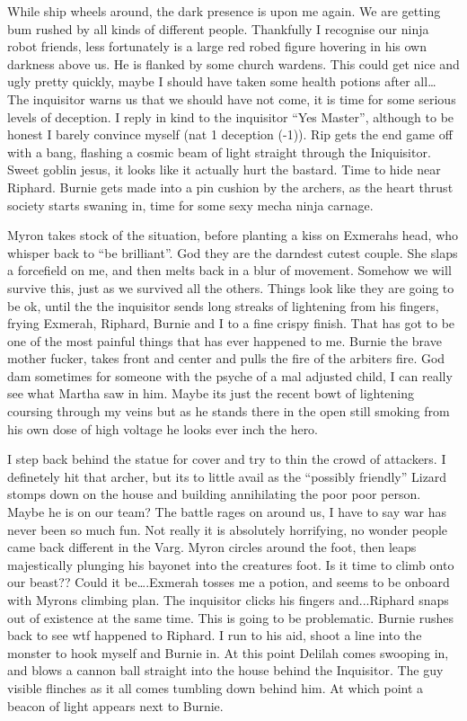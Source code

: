 \begin{multicols}{2}
While ship wheels around, the dark presence is upon me again. We are getting bum rushed by all kinds of different people. Thankfully I recognise our ninja robot friends, less fortunately is a large red robed figure hovering in his own darkness above us. He is flanked by some church wardens. This could get nice and ugly pretty quickly, maybe I should have taken some health potions after all… The inquisitor warns us that we should have not come, it is time for some serious levels of deception. I reply in kind to the inquisitor “Yes Master”, although to be honest I barely convince myself (nat 1 deception (-1)). Rip gets the end game off with a bang, flashing a cosmic beam of light straight through the Iniquisitor. Sweet goblin jesus, it looks like it actually hurt the bastard. Time to hide near Riphard. Burnie gets made into a pin cushion by the archers, as the heart thrust society starts swaning in, time for some sexy mecha ninja carnage.\medskip

Myron takes stock of the situation, before planting a kiss on Exmerahs head, who whisper back to “be brilliant”. God they are the darndest cutest couple. She slaps a forcefield on me, and then melts back in a blur of movement. Somehow we will survive this, just as we survived all the others. Things look like they are going to be ok, until the the inquisitor sends long streaks of lightening from his fingers, frying Exmerah, Riphard, Burnie and I to a fine crispy finish. That has got to be one of the most painful things that has ever happened to me. Burnie the brave mother fucker, takes front and center and pulls the fire of the arbiters fire. God dam sometimes for someone with the psyche of a mal adjusted child, I can really see what Martha saw in him. Maybe its just the recent bowt of lightening coursing through my veins but as he stands there in the open still smoking from his own dose of high voltage he looks ever inch the hero.\medskip

I step back behind the statue for cover and try to thin the crowd of attackers. I definetely hit that archer, but its to little avail as the “possibly friendly” Lizard stomps down on the house and building annihilating the poor poor person. Maybe he is on our team? The battle rages on around us, I have to say war has never been so much fun. Not really it is absolutely horrifying, no wonder people came back different in the Varg. Myron circles around the foot, then leaps majestically plunging his bayonet into the creatures foot. Is it time to climb onto our beast?? Could it be….Exmerah tosses me a potion, and seems to be onboard with Myrons climbing plan. The inquisitor clicks his fingers and...Riphard snaps out of existence at the same time. This is going to be problematic. Burnie rushes back to see wtf happened to Riphard. I run to his aid, shoot a line into the monster to hook myself and Burnie in. At this point Delilah comes swooping in, and blows a cannon ball straight into the house behind the Inquisitor. The guy visible flinches as it all comes tumbling down behind him. At which point a beacon of light appears next to Burnie.\medskip


\end{multicols}
